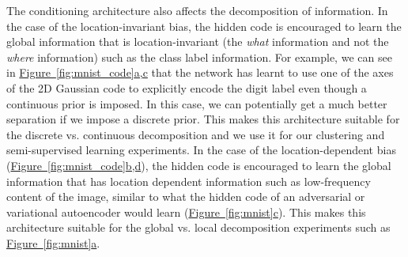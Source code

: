 \documentclass{article}
\newcommand{\myfigg}[2]{\hyperref[fig:#1]{Figure~\ref*{fig:#1}#2}}
\newcommand{\myfiggg}[3]{\hyperref[fig:#1]{Figure~\ref*{fig:#1}#2,#3}}
\begin{document}
The conditioning architecture also affects the decomposition of information. In the case of the location-invariant bias, the hidden code is encouraged to learn the global information that is location-invariant (the \emph{what} information and not the \emph{where} information) such as the class label information. For example, we can see in \myfiggg{mnist_code}{a}{c} that the network has learnt to use one of the axes of the 2D Gaussian code to explicitly encode the digit label even though a continuous prior is imposed. In this case, we can potentially get a much better separation if we impose a discrete prior. This makes this architecture suitable for the discrete vs. continuous decomposition and we use it for our clustering and semi-supervised learning experiments. In the case of the location-dependent bias (\myfiggg{mnist_code}{b}{d}), the hidden code is encouraged to learn the global information that has location dependent information such as low-frequency content of the image, similar to what the hidden code of an adversarial or variational autoencoder would learn (\myfigg{mnist}{c}). This makes this architecture suitable for the global vs. local decomposition experiments such as \myfigg{mnist}{a}.
\end{document}
